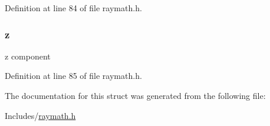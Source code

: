 Definition at line 84 of file raymath.\+h.

\subsubsection[{\texorpdfstring{z}{z}}]{ z}\hypertarget{structvec3_ae59474797d4b0b7d7544bde5c6421230}{}\label{structvec3_ae59474797d4b0b7d7544bde5c6421230}
z component 

Definition at line 85 of file raymath.\+h.



The documentation for this struct was generated from the following file\+:\begin{DoxyCompactItemize}
\item 
Includes/\hyperlink{raymath_8h}{raymath.\+h}\end{DoxyCompactItemize}
